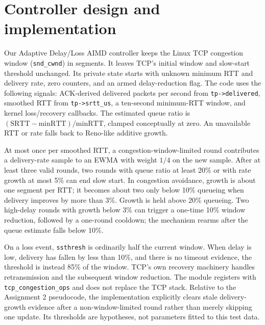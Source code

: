 \documentclass[11pt,letterpaper]{article}
\begin{document}
\section{Controller design and implementation}
Our Adaptive Delay/Loss AIMD controller keeps the Linux TCP congestion window
(\texttt{snd\_cwnd}) in segments. It leaves TCP's initial window and slow-start
threshold unchanged. Its private state starts with unknown minimum RTT and
delivery rate, zero counters, and an armed delay-reduction flag. The code uses
the following signals: ACK-derived delivered packets per second from
\texttt{tp->delivered}, smoothed RTT from \texttt{tp->srtt\_us}, a ten-second
minimum-RTT window, and kernel loss/recovery callbacks. The estimated queue
ratio is $(\mathrm{SRTT}-\mathrm{minRTT})/\mathrm{minRTT}$, clamped conceptually at
zero. An unavailable RTT or rate falls back to Reno-like additive growth.

At most once per smoothed RTT, a congestion-window-limited round contributes a
delivery-rate sample to an EWMA with weight $1/4$ on the new sample. After at
least three valid rounds, two rounds with queue ratio at least 20\% or with
rate growth at most 5\% can end slow start. In congestion avoidance, growth is
about one segment per RTT; it becomes about two only below 10\% queueing when
delivery improves by more than 3\%. Growth is held above 20\% queueing. Two
high-delay rounds with growth below 3\% can trigger a one-time 10\% window
reduction, followed by a one-round cooldown; the mechanism rearms after the
queue estimate falls below 10\%.

On a loss event, \texttt{ssthresh} is ordinarily half the current window.
When delay is low, delivery has fallen by less than 10\%, and there is no
timeout evidence, the threshold is instead 85\% of the window. TCP's own
recovery machinery handles retransmission and the subsequent window reduction.
The module registers with \texttt{tcp\_congestion\_ops} and does not replace
the TCP stack. Relative to the Assignment 2 pseudocode, the implementation
explicitly clears stale delivery-growth evidence after a non-window-limited
round rather than merely skipping one update. Its thresholds are hypotheses,
not parameters fitted to this test data.
\end{document}
